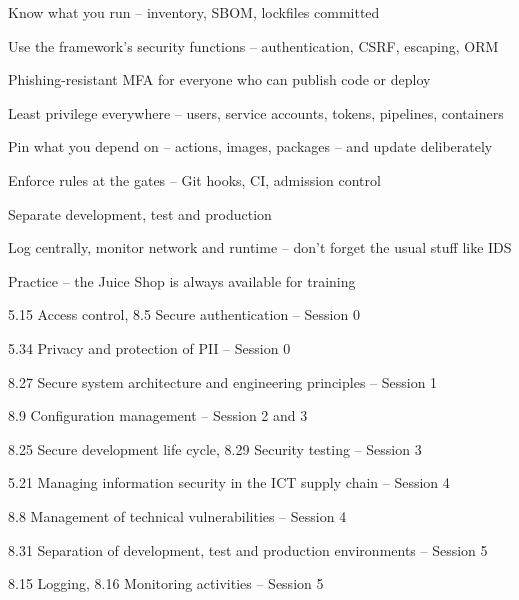 \documentclass[Screen16to9,17pt]{foils}
\begin{document}

\begin{list2}
\item Know what you run -- inventory, SBOM, lockfiles committed
\item Use the framework's security functions -- authentication, CSRF, escaping, ORM
\item Phishing-resistant MFA for everyone who can publish code or deploy
\item Least privilege everywhere -- users, service accounts, tokens, pipelines, containers
\item Pin what you depend on -- actions, images, packages -- and update deliberately
\item Enforce rules at the gates -- Git hooks, CI, admission control
\item Separate development, test and production
\item Log centrally, monitor network and runtime -- don't forget the usual stuff like IDS
\item Practice -- the Juice Shop is always available for training
\end{list2}



\begin{list2}
\item 5.15 Access control, 8.5 Secure authentication -- Session 0
\item 5.34 Privacy and protection of PII -- Session 0
\item 8.27 Secure system architecture and engineering principles -- Session 1
\item 8.9 Configuration management -- Session 2 and 3
\item 8.25 Secure development life cycle, 8.29 Security testing -- Session 3
\item 5.21 Managing information security in the ICT supply chain -- Session 4
\item 8.8 Management of technical vulnerabilities -- Session 4
\item 8.31 Separation of development, test and production environments -- Session 5
\item 8.15 Logging, 8.16 Monitoring activities -- Session 5
\end{list2}


\myquestionspage


\end{document}
